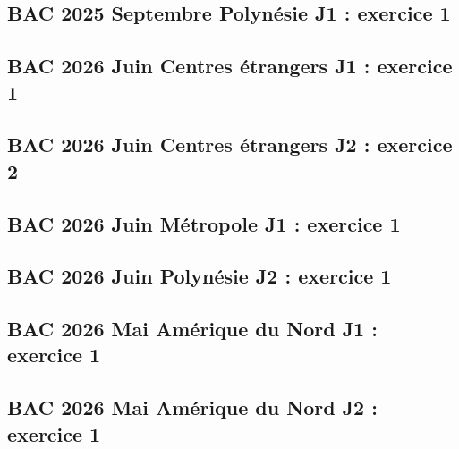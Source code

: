 \documentclass[lang=fr,edition=teacher,layout=sheet]{mxbook}
\begin{document}
\subsection*{BAC 2025 Septembre Polynésie J1 : exercice 1}
\begingroup\endgroup
\par\bigskip
{}\subsection*{BAC 2026 Juin Centres étrangers J1 : exercice 1}
\begingroup\endgroup
\par\bigskip
{}\subsection*{BAC 2026 Juin Centres étrangers J2 : exercice 2}
\begingroup\endgroup
\par\bigskip
{}\subsection*{BAC 2026 Juin Métropole J1 : exercice 1}
\begingroup\endgroup
\par\bigskip
{}\subsection*{BAC 2026 Juin Polynésie J2 : exercice 1}
\begingroup\endgroup
\par\bigskip
{}\subsection*{BAC 2026 Mai Amérique du Nord J1 : exercice 1}
\begingroup\endgroup
\par\bigskip
{}\subsection*{BAC 2026 Mai Amérique du Nord J2 : exercice 1}
\end{document}
